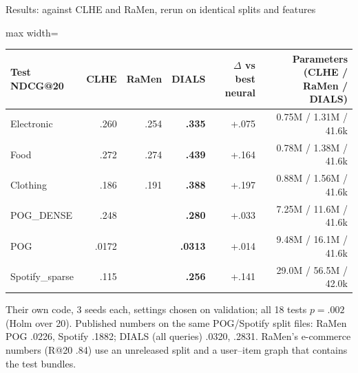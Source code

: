 \documentclass[10pt,aspectratio=169]{beamer}
\newcommand{\key}[1]{\textcolor{Accent}{\textbf{#1}}}
\newcommand{\fn}[1]{\textcolor{Muted}{\scriptsize #1}}
\begin{document}
\begin{frame}{Results: against CLHE and RaMen, rerun on identical splits and features}
\centering\renewcommand{\arraystretch}{1.3}\small
\begin{adjustbox}{max width=\textwidth}\begin{tabular}{lrrrrr}\toprule
Test NDCG@20 & CLHE & RaMen & \key{DIALS} & $\Delta$ vs best neural & Parameters (CLHE / RaMen / DIALS)\\\midrule
Electronic & .260 & .254 & \textbf{.335} & +.075 & 0.75M / 1.31M / 41.6k\\
Food & .272 & .274 & \textbf{.439} & +.164 & 0.78M / 1.38M / 41.6k\\
Clothing & .186 & .191 & \textbf{.388} & +.197 & 0.88M / 1.56M / 41.6k\\
POG\_DENSE & .248 & & \textbf{.280} & +.033 & 7.25M / 11.6M / 41.6k\\
POG & .0172 & & \textbf{.0313} & +.014 & 9.48M / 16.1M / 41.6k\\
Spotify\_sparse & .115 & & \textbf{.256} & +.141 & 29.0M / 56.5M / 42.0k\\\bottomrule
\end{tabular}\end{adjustbox}\par
\raggedright\vspace{2mm}
\fn{Their own code, 3 seeds each, settings chosen on validation; all 18 tests $p=.002$ (Holm over 20). Published numbers on the same POG/Spotify split files: RaMen POG .0226, Spotify .1882; DIALS (all queries) .0320, .2831. RaMen's e-commerce numbers (R@20 .84) use an unreleased split and a user--item graph that contains the test bundles.}
\end{frame}
\end{document}

